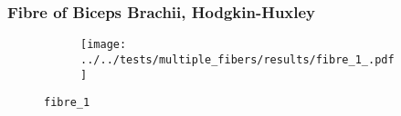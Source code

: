 %
\begin{frame}
  \frametitle{Fibre of Biceps Brachii, Hodgkin-Huxley}
  \vspace*{-0.2cm}
  \begin{figure}[h!]
    \begin{subfigure}[t]{0.5\textwidth}%
    \centering
    \end{subfigure}
    \begin{subfigure}[t]{0.48\textwidth}%
      \centering%
      \texttt{[image: ../../tests/multiple\_fibers/results/fibre\_1\_.pdf]}%
    \end{subfigure}%
    \caption{\lstinline{fibre_1}}
  \end{figure} 
\end{frame}
%

